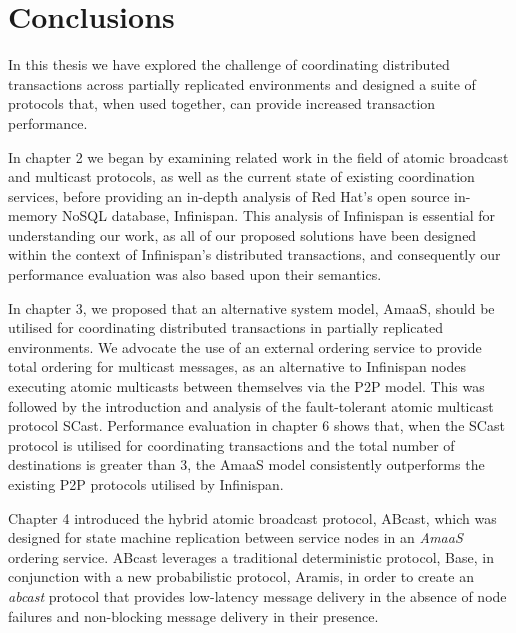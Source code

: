 \chapter{Conclusions}

    \graphicspath{{Chapter7-Conclusions/Figs/Vector/}{Chapter3-Conclusions/Figs/}}

In this thesis we have explored the challenge of coordinating distributed transactions across partially replicated environments and designed a suite of protocols that, when used together, can provide increased transaction performance. 

In chapter 2 we began by examining related work in the field of atomic broadcast and multicast protocols, as well as the current state of existing coordination services, before providing an in-depth analysis of Red Hat's open source in-memory NoSQL database, Infinispan.  This analysis of Infinispan is essential for understanding our work, as all of our proposed solutions have been designed within the context of Infinispan's distributed transactions, and consequently our performance evaluation was also based upon their semantics.

In chapter 3, we proposed that an alternative system model, \textsf{AmaaS}, should be utilised for coordinating distributed transactions in partially replicated environments.  We advocate the use of an external ordering service to provide total ordering for multicast messages, as an alternative to Infinispan nodes executing atomic multicasts between themselves via the P2P model.  This was followed by the introduction and analysis of the fault-tolerant atomic multicast protocol \textsf{SCast}.  Performance evaluation in chapter 6 shows that, when the \textsf{SCast} protocol is utilised for coordinating transactions and the total number of destinations is greater than 3, the \textsf{AmaaS} model consistently outperforms the existing P2P protocols utilised by Infinispan.

Chapter 4 introduced the hybrid atomic broadcast protocol, \textsf{ABcast}, which was designed for state machine replication between service nodes in an \emph{AmaaS} ordering service.  \textsf{ABcast} leverages a traditional deterministic protocol, \textsf{Base}, in conjunction with a new probabilistic protocol, \textsf{Aramis}, in order to create an \emph{abcast} protocol that provides low-latency message delivery in the absence of node failures and non-blocking message delivery in their presence.  

